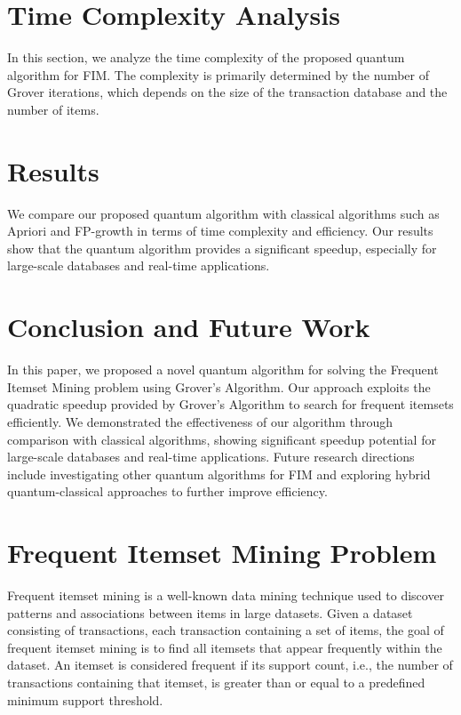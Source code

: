 \section{Time Complexity Analysis}\label{sec:analysis}

In this section, we analyze the time complexity of the proposed quantum algorithm for FIM. The complexity is primarily determined by the number of Grover iterations, which depends on the size of the transaction database and the number of items.


\section{Results}\label{sec:results}

We compare our proposed quantum algorithm with classical algorithms such as Apriori and FP-growth in terms of time complexity and efficiency. Our results show that the quantum algorithm provides a significant speedup, especially for large-scale databases and real-time applications.


\section{Conclusion and Future Work}\label{sec:conclusion}

In this paper, we proposed a novel quantum algorithm for solving the Frequent Itemset Mining problem using Grover's Algorithm. Our approach exploits the quadratic speedup provided by Grover's Algorithm to search for frequent itemsets efficiently. We demonstrated the effectiveness of our algorithm through comparison with classical algorithms, showing significant speedup potential for large-scale databases and real-time applications. Future research directions include investigating other quantum algorithms for FIM and exploring hybrid quantum-classical approaches to further improve efficiency.

\section{Frequent Itemset Mining Problem}
Frequent itemset mining is a well-known data mining technique used to discover patterns and associations between items in large datasets. Given a dataset consisting of transactions, each transaction containing a set of items, the goal of frequent itemset mining is to find all itemsets that appear frequently within the dataset. An itemset is considered frequent if its support count, i.e., the number of transactions containing that itemset, is greater than or equal to a predefined minimum support threshold.

